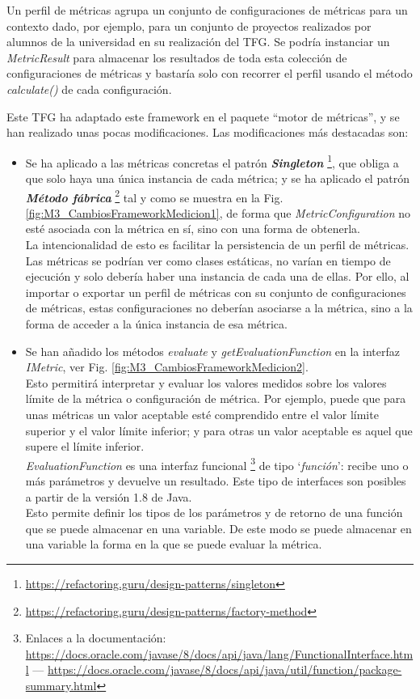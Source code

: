 Un perfil de métricas agrupa un conjunto de configuraciones de métricas para un contexto dado, por ejemplo, para un conjunto de proyectos realizados por alumnos de la universidad en su realización del TFG. Se podría instanciar un \textit{MetricResult} para almacenar los resultados de toda esta colección de configuraciones de métricas y bastaría solo con recorrer el perfil usando el método \textit{calculate()} de cada configuración.

Este TFG ha adaptado este framework en el paquete ``motor de métricas'', y se han realizado unas pocas modificaciones. Las modificaciones más destacadas son:

\begin{itemize}
	\tightlist
	\item Se ha aplicado a las métricas concretas el patrón \textit{\textbf{Singleton}} \footnote{\url{https://refactoring.guru/design-patterns/singleton}}, que obliga a que solo haya una única instancia de cada métrica; y se ha aplicado el patrón \textit{\textbf{Método fábrica}} \footnote{\url{https://refactoring.guru/design-patterns/factory-method}} tal y como se muestra en la Fig. \ref{fig:M3_CambiosFrameworkMedicion1}, de forma que \textit{MetricConfiguration} no esté asociada con la métrica en sí, sino con una forma de obtenerla.\\
	La intencionalidad de esto es facilitar la persistencia de un perfil de métricas. Las métricas se podrían ver como clases estáticas, no varían en tiempo de ejecución y solo debería haber una instancia de cada una de ellas. Por ello, al importar o exportar un perfil de métricas con su conjunto de configuraciones de métricas, estas configuraciones no deberían asociarse a la métrica, sino a la forma de acceder a la única instancia de esa métrica. 
	\item Se han añadido los métodos \textit{evaluate} y \textit{getEvaluationFunction} en la interfaz \textit{IMetric}, ver Fig. \ref{fig:M3_CambiosFrameworkMedicion2}.\\
	Esto permitirá interpretar y evaluar los valores medidos sobre los valores límite de la métrica o configuración de métrica. Por ejemplo, puede que para unas métricas un valor aceptable esté comprendido entre el valor límite superior y el valor límite inferior; y para otras un valor aceptable es aquel que supere el límite inferior.\\
	\textit{EvaluationFunction} es una interfaz funcional \footnote{Enlaces a la documentación: \url{https://docs.oracle.com/javase/8/docs/api/java/lang/FunctionalInterface.html} --- \url{https://docs.oracle.com/javase/8/docs/api/java/util/function/package-summary.html}} 
	de tipo `\textit{función}': recibe uno o más parámetros y devuelve un resultado. Este tipo de interfaces son posibles a partir de la versión 1.8 de Java.\\
	Esto permite definir los tipos de los parámetros y de retorno de una función que se puede almacenar en una variable. De este modo se puede almacenar en una variable la forma en la que se puede evaluar la métrica.
\end{itemize}


